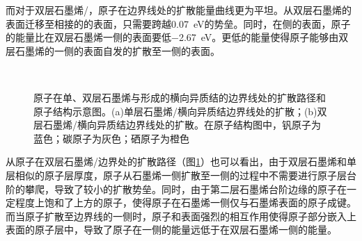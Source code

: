     而对于双层石墨烯/，原子在边界线处的扩散能量曲线更为平坦。从双层石墨烯的表面迁移至相接的的表面，只需要跨越\SI{0.07}{\electronvolt}的势垒。同时，在侧的表面，原子的能量比在双层石墨烯一侧的表面要低\SI{-2.67}{\electronvolt}。更低的能量使得原子能够由双层石墨烯的一侧的表面自发的扩散至一侧的表面。
    \begin{figure}[htb]
        \\[-1ex]
        \caption{原子在单、双层石墨烯与形成的横向异质结的边界线处的扩散路径和原子结构示意图。(a)单层石墨烯/横向异质结边界线处的扩散；(b)双层石墨烯/横向异质结边界线处的扩散。在原子结构图中，钒原子为蓝色；碳原子为灰色；硒原子为橙色}
        \label{fig:VS_structure_VNeb}
    \end{figure}

    从原子在双层石墨烯/边界处的扩散路径（图\ref{fig:VS_structure_VNeb}）也可以看出，由于双层石墨烯和单层相似的原子层厚度，原子从石墨烯一侧扩散至一侧的过程中不需要进行原子层台阶的攀爬，导致了较小的扩散势垒。同时，由于第二层石墨烯台阶边缘的原子在一定程度上饱和了上方的原子，使得原子在石墨烯一侧仅与石墨烯表面的原子成键。而当原子扩散至边界线的一侧时，原子和表面强烈的相互作用使得原子部分嵌入上表面的原子层中，导致了原子在一侧的能量远低于在双层石墨烯一侧的能量。

